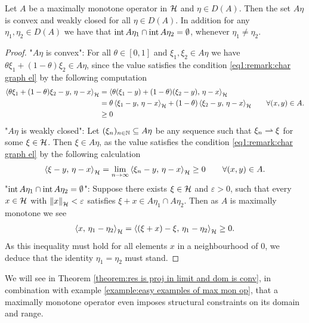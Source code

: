 \begin{lemma}\label{lemma:mapped element is weak cl and conv}
	Let $ A $ be a maximally monotone operator in $ \mathcal{H} $  and
	$ \eta\in D(A) $. Then the set $ A\eta $ is convex and weakly closed 
	for all $ \eta \in D(A) $. In addition for any
	$ \eta_1,\eta_2\in D(A) $ we have
	that $ \operatorname*{\mathrm{int}} A\eta_1\cap \operatorname*{\mathrm{int}} A\eta_2=\emptyset $, whenever $ \eta_1\neq \eta_2 $.
\end{lemma}
\begin{proof}
	"$ A\eta $ is convex": For all  $ \theta\in[0,1] $ and $ \xi_1,\xi_2\in A\eta $
	we have $ \theta\xi_1+(1-\theta)\xi_2\in A\eta $, since the value satisfies
	the condition \eqref{eq1:remark:char graph el} by the following computation
	\begin{align*}
		\begin{split}
			\left\langle \theta \xi_1 + (1-\theta) \xi_2 -y,\,\eta-x\right\rangle_{\mathcal{H}}
			&=\left\langle \theta (\xi_1-y) + (1-\theta) (\xi_2 -y) ,\,\eta-x\right\rangle_{\mathcal{H}}\\
			&=\theta\left\langle \xi_1-y,\,\eta-x\right\rangle_{\mathcal{H}}
			+(1-\theta)\left\langle \xi_2 -y,\,\eta-x\right\rangle_{\mathcal{H}}\\
			& \geq 0
		\end{split}
		\qquad
		\forall (x,y)\in A.
	\end{align*}
	"$ A\eta $ is weakly closed": Let $ (\xi_n)_{n\in\mathbb{N}}\subseteq A\eta$ 
	be any sequence such that $ \xi_n\rightharpoonup \xi $ for some $ \xi\in\mathcal{H} $. 
	Then $ \xi\in A\eta $, as the value satisfies the condition
	\eqref{eq1:remark:char graph el} by the following calculation
	\begin{align*}
		\left\langle \xi-y,\,\eta-x\right\rangle_{\mathcal{H}}
		=\lim_{n\rightarrow\infty}\left\langle \xi_n-y,\,\eta-x\right\rangle_{\mathcal{H}}
		\geq 0
		\qquad
		\forall (x,y)\in A.
	\end{align*}
	"$\operatorname*{\mathrm{int}} A\eta_1\cap \operatorname*{\mathrm{int}} A\eta_2=\emptyset$": Suppose there exists
	$ \xi\in\mathcal{H} $ and $ \varepsilon>0 $, such that every $ x\in\mathcal{H} $ with
	$ \left\Vert x\right\Vert_{\mathcal{H}}<\varepsilon $ satisfies $ \xi+x\in A \eta_1\cap A\eta_2 $.
	Then as $ A $ is maximally monotone we see
	\begin{align*}
		\left\langle x,\,\eta_1-\eta_2\right\rangle_{\mathcal{H}}
		=\left\langle (\xi+x)-\xi,\,\eta_1-\eta_2\right\rangle_{\mathcal{H}}
		\geq 0.
	\end{align*}
	As this inequality must hold for all elements $ x $ in a neighbourhood
	of $ 0 $, we deduce that the identity $ \eta_1=\eta_2 $ must stand.
\end{proof}

We will see in Theorem \ref{theorem:res is proj in limit and dom is conv},
in combination with example \ref{example:easy examples of max mon op},
that a maximally monotone operator even imposes structural constraints 
on its domain and range.\smallskip

